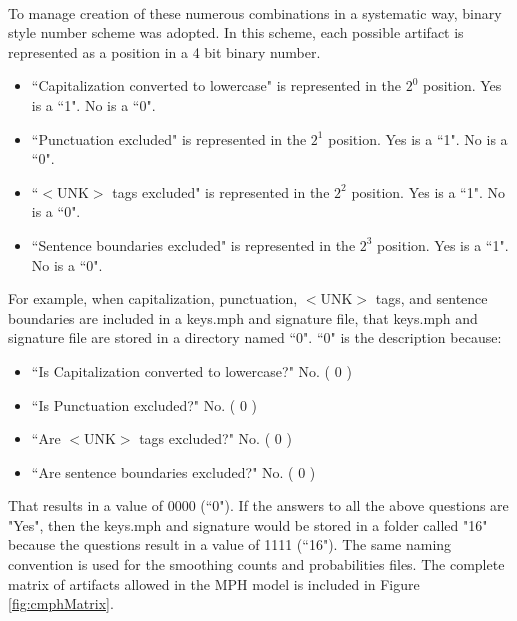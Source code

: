 		\paragraph*{}  To manage creation of these numerous combinations in a systematic way,  binary style number scheme was adopted. In this scheme, each possible artifact is represented as a position in a 4 bit binary number.  
		\begin{itemize}
			\item ``Capitalization converted to lowercase" is represented in the $2^0$ position. Yes is a ``1".  No is a ``0".
			\item ``Punctuation excluded" is represented in the $2^1$ position. Yes is a ``1".  No is a ``0".
			\item ``$<\text{UNK}>$ tags excluded" is represented in the $2^2$ position. Yes is a ``1".  No is a ``0".
			\item ``Sentence boundaries excluded" is represented in the $2^3$ position. Yes is a ``1".  No is a ``0".
		\end{itemize}
		For example, when capitalization, punctuation, $<\text{UNK}>$ tags, and sentence boundaries are included in a keys.mph and signature file, that keys.mph and signature file are stored in a directory named ``0".  ``0" is the description because:
		\begin{itemize}
			\item ``Is Capitalization converted to lowercase?" No. ( 0 )
			\item ``Is Punctuation excluded?" No. ( 0 )
			\item ``Are $<\text{UNK}>$ tags excluded?" No. ( 0 )
			\item ``Are sentence boundaries excluded?" No. ( 0 )
		\end{itemize}
		That results in a value of 0000 (``0").  If the answers to all the above questions are "Yes", then the keys.mph and signature would be stored in a folder called "16" because the questions result in a value of 1111 (``16").  The same naming convention is used for the smoothing counts and probabilities files.
		 The complete matrix of artifacts allowed in the MPH model is included in Figure \ref{fig:cmphMatrix}.
		
